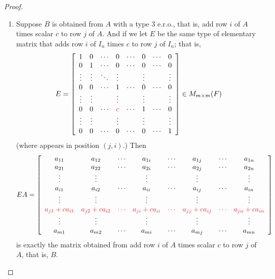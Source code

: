 \begin{proof}
\begin{enumerate}
\item 
Suppose \(B\) is obtained from \(A\) with a type 3 e.r.o., that is, add row \(i\) of \(A\) times scalar \(c\) to row \(j\) of \(A\).
And if we let \(E\) be the same type of elementary matrix that adds row \(i\) of \(I_n\) times \(c\) to row \(j\) of \(I_n\);
that is,
\[
    E=\left[\begin{array}{cccccccc}
        1 & 0 & \cdots & 0 & \cdots & 0 & \cdots & 0 \\
        0 & 1 & \cdots & 0 & \cdots & 0 & \cdots & 0 \\
        \vdots & \vdots & \ddots & \vdots & & \vdots & & \vdots \\
        0 & 0 & \cdots & 1 & \cdots & 0 & \cdots & 0 \\
        \vdots & \vdots & & \vdots & & \vdots & & \vdots \\
        0 & 0 & \cdots & \RED{c} & \cdots & 1 & \cdots & 0 \\
        \vdots & \vdots & & \vdots & & \vdots & & \vdots \\
        0 & 0 & \cdots & 0 & \cdots & 0 & \cdots & 1
    \end{array}\right] \in M_{m \X m}(F)
\]
(where  appears in position \((j, i)\).)
Then
\[
    E A= \left[\begin{array}{cccccccc}
        a_{11} & a_{12} & \cdots & a_{1 i} & \cdots & a_{1 j} & \cdots & a_{1 n} \\
        a_{21} & a_{22} & \cdots & a_{2 i} & \cdots & a_{2 j} & \cdots & a_{2 n} \\
        \vdots & \vdots & & \vdots & & \vdots & & \vdots \\
        a_{i 1} & a_{i 2} & \cdots & a_{i i} & \cdots & a_{i j} & \cdots & a_{i n} \\
        \vdots & \vdots & & \vdots & & \vdots & & \vdots \\
        \RED{a_{j 1} + c a_{i 1}} & \RED{a_{j 2} + c a_{i 2}} & \RED{\cdots} & \RED{a_{j i}+ c a_{i i}} & \RED{\cdots} & \RED{a_{j j} + c a_{i j}} & \RED{\cdots} & \RED{a_{j n}+ c a_{i n}} \\
        \vdots & \vdots & & \vdots & & \vdots & & \vdots \\
        a_{m 1} & a_{m 2} & \cdots & a_{m i} & \cdots & a_{m j} & \cdots & a_{m n}
\end{array}\right]
\]
is exactly the matrix obtained from add row \(i\) of \(A\) times scalar \(c\) to row \(j\) of \(A\), that is, \(B\).
\end{enumerate}


\end{proof}
